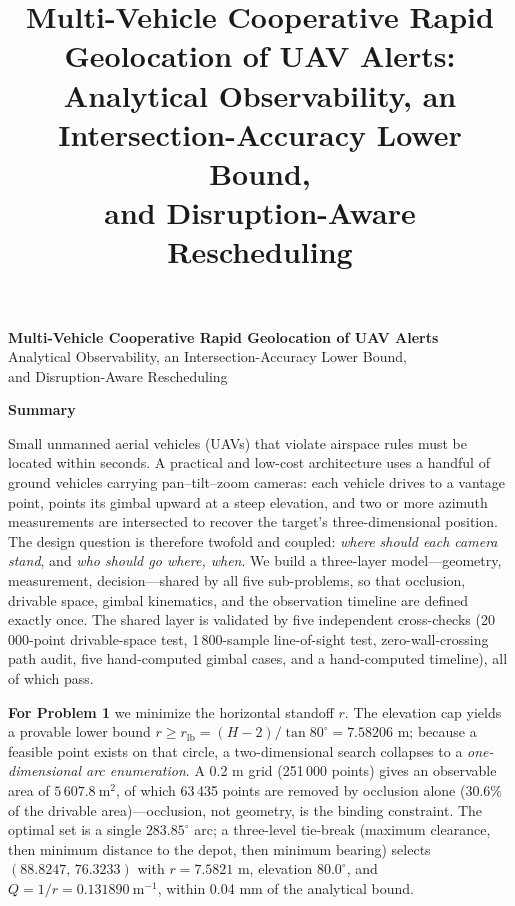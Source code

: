 \documentclass[12pt]{article}
\title{\bfseries Multi-Vehicle Cooperative Rapid Geolocation of UAV Alerts:\\[3pt]
\large Analytical Observability, an Intersection-Accuracy Lower Bound,\\
and Disruption-Aware Rescheduling}
\author{}
\date{}
\begin{document}
\begin{center}
{\LARGE\bfseries Multi-Vehicle Cooperative Rapid Geolocation of UAV Alerts}\\[6pt]
{\large Analytical Observability, an Intersection-Accuracy Lower Bound,\\[2pt]
and Disruption-Aware Rescheduling}
\end{center}

\vspace{6pt}
\begin{center}{\large\bfseries Summary}\end{center}

\begingroup
\small
\setlength{\parskip}{3pt}

Small unmanned aerial vehicles (UAVs) that violate airspace rules must be located within seconds. A practical and low-cost architecture uses a handful of ground vehicles carrying pan--tilt--zoom cameras: each vehicle drives to a vantage point, points its gimbal upward at a steep elevation, and two or more azimuth measurements are intersected to recover the target's three-dimensional position. The design question is therefore twofold and coupled: \emph{where should each camera stand}, and \emph{who should go where, when}. We build a three-layer model---geometry, measurement, decision---shared by all five sub-problems, so that occlusion, drivable space, gimbal kinematics, and the observation timeline are defined exactly once. The shared layer is validated by five independent cross-checks (20\,000-point drivable-space test, 1\,800-sample line-of-sight test, zero-wall-crossing path audit, five hand-computed gimbal cases, and a hand-computed timeline), all of which pass.

\textbf{For Problem 1} we minimize the horizontal standoff $r$. The elevation cap yields a provable lower bound $r\ge r_{\mathrm{lb}}=(H-2)/\tan 80^\circ=7.58206$ m; because a feasible point exists on that circle, a two-dimensional search collapses to a \emph{one-dimensional arc enumeration}. A 0.2 m grid (251\,000 points) gives an observable area of $5\,607.8\ \mathrm{m^2}$, of which 63\,435 points are removed by occlusion alone (30.6\% of the drivable area)---occlusion, not geometry, is the binding constraint. The optimal set is a single $283.85^\circ$ arc; a three-level tie-break (maximum clearance, then minimum distance to the depot, then minimum bearing) selects $(88.8247,\,76.3233)$ with $r=7.5821$ m, elevation $80.0^\circ$, and $Q=1/r=0.131890\ \mathrm{m^{-1}}$, within 0.04 mm of the analytical bound.
\end{document}
